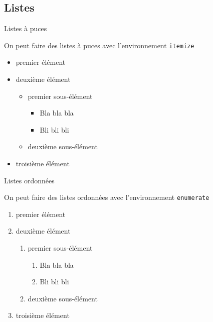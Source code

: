 \documentclass[french]{beamer}
\begin{document}
  \subsection{Listes}
  \begin{frame}[fragile]{Listes à puces}
    \begin{block}{}
      On peut faire des listes à puces avec l'environnement \verb|itemize|
        \begin{itemize}
          \item premier élément
          \item deuxième élément
          \begin{itemize}
            \item premier sous-élément
            \begin{itemize}
              \item Bla bla bla
              \item Bli bli bli
            \end{itemize}
            \item deuxième sous-élément
          \end{itemize}
          \item troisième élément
        \end{itemize}
    \end{block}
  \end{frame}
  
  \begin{frame}[fragile]{Listes ordonnées}
    \begin{block}{}
      On peut faire des listes ordonnées avec l'environnement \verb|enumerate|
        \begin{enumerate}
          \item premier élément
          \item deuxième élément
          \begin{enumerate}
            \item premier sous-élément
            \begin{enumerate}
              \item Bla bla bla
              \item Bli bli bli
            \end{enumerate}
            \item deuxième sous-élément
          \end{enumerate}
          \item troisième élément
        \end{enumerate}
    \end{block}
  \end{frame}
  
\end{document}
